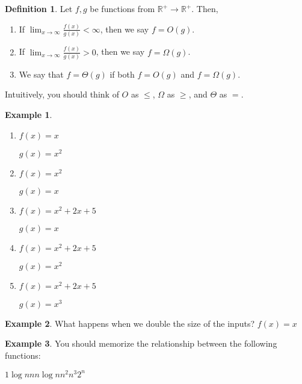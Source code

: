 \documentclass[10pt]{article}
\theoremstyle{definition}
\newtheorem{example}{Example}
\newtheorem{defn}{Definition}
\newcommand{\R}{\mathbb R}
\begin{document}
\newpage
\begin{defn}
    Let $f,g$ be functions from $\R^+\to\R^+$.
    Then,
    \begin{enumerate}
        \item If $\displaystyle\lim_{x\to\infty} \frac{f(x)}{g(x)} < \infty$, then we say $f = O(g)$.
        \item If $\displaystyle\lim_{x\to\infty} \frac{f(x)}{g(x)} > 0$, then we say $f = \Omega(g)$.
        \item We say that $f = \Theta(g)$ if both $f=O(g)$ and $f=\Omega(g)$.
    \end{enumerate}
    Intuitively, you should think of $O$ as $\le$, $\Omega$ as $\ge$, and $\Theta$ as $=$.
\end{defn}

\begin{example}~
    \begin{enumerate}
        \item 
            $f(x) = x$
            
            $g(x) = x^2$
            \vspace{1in}
        \item
            $f(x) = x^2$
            
            $g(x) = x$
            \vspace{1in}
        \item
            $f(x) = x^2 + 2x + 5$
            
            $g(x) = x$
            \vspace{1in}
        \item
            $f(x) = x^2 + 2x + 5$
            
            $g(x) = x^2$
            \vspace{1in}
        \item
            $f(x) = x^2 + 2x + 5$
            
            $g(x) = x^3$
    \end{enumerate}
\end{example}

\newpage
\begin{example}
    What happens when we double the size of the inputs?
    $f(x) = x$
\end{example}

\newpage
\begin{example}
    You should memorize the relationship between the following functions:
        
        \vspace{0.15in}
        \begin{center}
        $1$\qquad \qquad $\log n$\qquad \qquad  $n$\qquad \qquad  $n\log n$\qquad \qquad  $n^2$\qquad \qquad  $n^3$\qquad \qquad  $2^n$
        \end{center}
        \vspace{0.15in}
\end{example}
\end{document}
